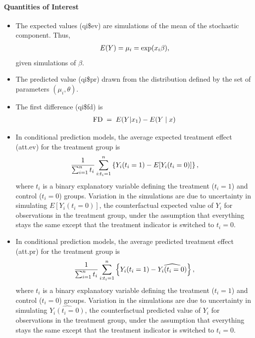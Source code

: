 \documentclass[letterpaper,10pt,english]{sphinxmanual}
\begin{document}
\paragraph{Quantities of Interest}
\label{zelig-negbin:quantities-of-interest}\begin{itemize}
\item {} 
The expected values (qi\$ev) are simulations of the mean of the
stochastic component. Thus,
\begin{gather}
\begin{split}E(Y) = \mu_i = \exp(x_i
  \beta),\end{split}\notag
\end{gather}
given simulations of \(\beta\).

\item {} 
The predicted value (qi\$pr) drawn from the distribution defined by
the set of parameters \((\mu_i, \theta)\).

\item {} 
The first difference (qi\$fd) is
\begin{gather}
\begin{split}\textrm{FD} \; = \; E(Y | x_1) - E(Y \mid x)\end{split}\notag
\end{gather}
\item {} 
In conditional prediction models, the average expected treatment
effect (att.ev) for the treatment group is
\begin{gather}
\begin{split}\frac{1}{\sum_{i=1}^n t_i}\sum_{i:t_i=1}^n \left\{ Y_i(t_i=1) -
      E[Y_i(t_i=0)] \right\},\end{split}\notag
\end{gather}
where \(t_i\) is a binary explanatory variable defining the
treatment (\(t_i=1\)) and control (\(t_i=0\)) groups.
Variation in the simulations are due to uncertainty in simulating
\(E[Y_i(t_i=0)]\), the counterfactual expected value of
\(Y_i\) for observations in the treatment group, under the
assumption that everything stays the same except that the treatment
indicator is switched to \(t_i=0\).

\item {} 
In conditional prediction models, the average predicted treatment
effect (att.pr) for the treatment group is
\begin{gather}
\begin{split}\frac{1}{\sum_{i=1}^n t_i}\sum_{i:t_i=1}^n \left\{ Y_i(t_i=1) -
      \widehat{Y_i(t_i=0)} \right\},\end{split}\notag
\end{gather}
where \(t_i\) is a binary explanatory variable defining the
treatment (\(t_i=1\)) and control (\(t_i=0\)) groups.
Variation in the simulations are due to uncertainty in simulating
\(\widehat{Y_i(t_i=0)}\), the counterfactual predicted value of
\(Y_i\) for observations in the treatment group, under the
assumption that everything stays the same except that the treatment
indicator is switched to \(t_i=0\).

\end{itemize}
\end{document}
